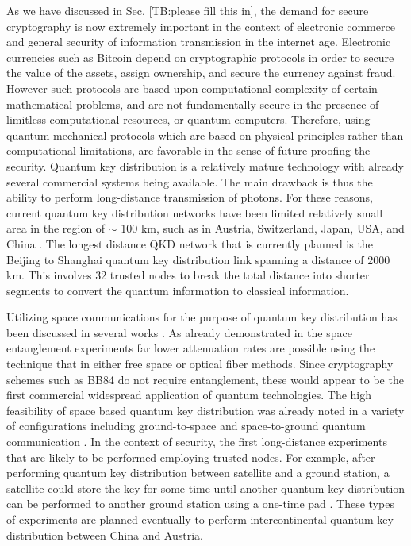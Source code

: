 \documentclass[aps,rmp,reprint,amsmath,amssymb,graphicx,longbibliography]{revtex4-1}
\begin{document}
As we have discussed in Sec. [TB:please fill this in], the demand for secure cryptography is now extremely important in the context of electronic commerce and general security of information transmission in the internet age. Electronic currencies such as Bitcoin depend on cryptographic protocols in order to secure the value of the assets, assign ownership, and secure the currency against fraud.  However such protocols are based upon computational complexity of certain mathematical problems, and are not fundamentally secure in the presence of limitless computational resources, or quantum computers.  Therefore, using quantum mechanical protocols which are based on physical principles rather than computational limitations, are favorable in the sense of future-proofing the security.  Quantum key distribution is a relatively mature technology with already several commercial systems being available.  The main drawback is thus the ability to perform long-distance transmission of photons.  For these reasons, current quantum key distribution networks have been limited relatively small area in the region of $ \sim $ 100 km, such as in Austria, Switzerland, Japan, USA, and China \cite{lo2014secure}.   The longest distance QKD network that is currently planned is the Beijing to Shanghai quantum key distribution link spanning a distance of 2000 km.  This involves 32 trusted nodes to break the total distance into shorter segments to convert the quantum information to classical information.  

Utilizing space communications for the purpose of quantum key distribution has been discussed in several works \cite{hughes2000quantum,rarity2002ground,pfennigbauer2003free,aspelmeyer2003long,armengol08}. As already demonstrated in the space entanglement  experiments \cite{yin2017satellite,ren2017ground,liao2017satellite} far lower attenuation rates are possible using the technique that in either free space or optical fiber methods.  Since cryptography schemes such as BB84 do not require entanglement, these would appear to be the first commercial widespread application of quantum technologies.  The high feasibility of space based quantum key distribution was already noted in a variety of configurations including ground-to-space and space-to-ground quantum communication \cite{rarity2002ground,aspelmeyer2003long}.  In the context of security, the first long-distance experiments that are likely to be performed employing trusted nodes.  For example, after performing quantum key distribution between satellite and a ground station, a satellite could store the key for some time until another quantum key distribution can be performed to another ground station using a one-time pad \cite{liao2017satellite}.  These types of experiments are planned eventually to perform intercontinental quantum key distribution between China and Austria.  
\end{document}
